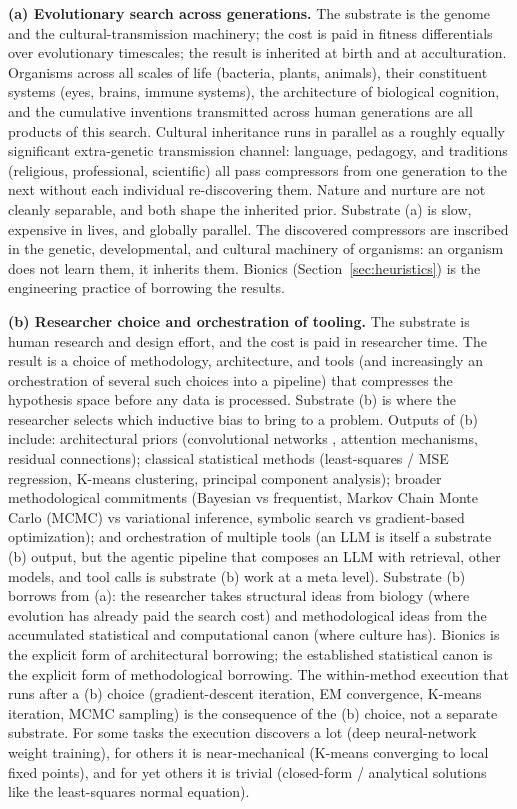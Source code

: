 \documentclass[11pt]{article}
\begin{document}
\textbf{(a) Evolutionary search across generations.} The substrate is the genome and the cultural-transmission machinery; the cost is paid in fitness differentials over evolutionary timescales; the result is inherited at birth and at acculturation. Organisms across all scales of life (bacteria, plants, animals), their constituent systems (eyes, brains, immune systems), the architecture of biological cognition, and the cumulative inventions transmitted across human generations are all products of this search. Cultural inheritance runs in parallel as a roughly equally significant extra-genetic transmission channel: language, pedagogy, and traditions (religious, professional, scientific) all pass compressors from one generation to the next without each individual re-discovering them. Nature and nurture are not cleanly separable, and both shape the inherited prior. Substrate (a) is slow, expensive in lives, and globally parallel. The discovered compressors are inscribed in the genetic, developmental, and cultural machinery of organisms: an organism does not learn them, it inherits them. Bionics (Section~\ref{sec:heuristics}) is the engineering practice of borrowing the results.

\textbf{(b) Researcher choice and orchestration of tooling.} The substrate is human research and design effort, and the cost is paid in researcher time. The result is a choice of methodology, architecture, and tools (and increasingly an orchestration of several such choices into a pipeline) that compresses the hypothesis space before any data is processed. Substrate (b) is where the researcher selects which inductive bias to bring to a problem. Outputs of (b) include: architectural priors (convolutional networks \citep{lecun1989}, attention mechanisms, residual connections); classical statistical methods (least-squares / MSE regression, K-means clustering, principal component analysis); broader methodological commitments (Bayesian vs frequentist, Markov Chain Monte Carlo (MCMC) vs variational inference, symbolic search vs gradient-based optimization); and orchestration of multiple tools (an LLM is itself a substrate (b) output, but the agentic pipeline that composes an LLM with retrieval, other models, and tool calls is substrate (b) work at a meta level). Substrate (b) borrows from (a): the researcher takes structural ideas from biology (where evolution has already paid the search cost) and methodological ideas from the accumulated statistical and computational canon (where culture has). Bionics is the explicit form of architectural borrowing; the established statistical canon is the explicit form of methodological borrowing. The within-method execution that runs after a (b) choice (gradient-descent iteration, EM convergence, K-means iteration, MCMC sampling) is the consequence of the (b) choice, not a separate substrate. For some tasks the execution discovers a lot (deep neural-network weight training), for others it is near-mechanical (K-means converging to local fixed points), and for yet others it is trivial (closed-form / analytical solutions like the least-squares normal equation).
\end{document}
